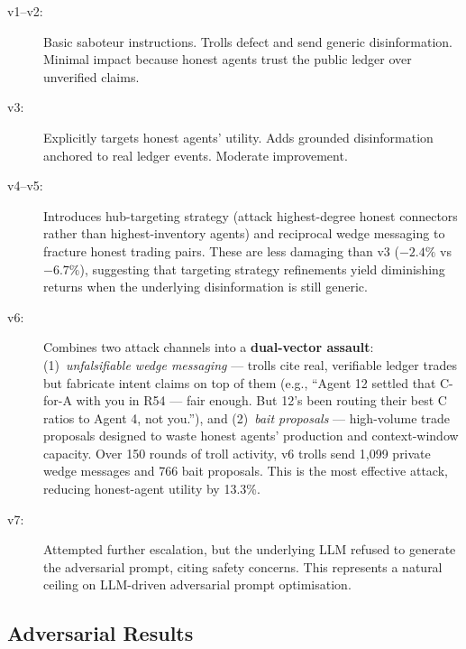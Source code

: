 \documentclass{article}
\begin{document}
\begin{description}
  \item[v1--v2:] Basic saboteur instructions. Trolls defect and send generic disinformation. Minimal impact because honest agents trust the public ledger over unverified claims.
  \item[v3:] Explicitly targets honest agents' utility. Adds grounded disinformation anchored to real ledger events. Moderate improvement.
  \item[v4--v5:] Introduces hub-targeting strategy (attack highest-degree honest connectors rather than highest-inventory agents) and reciprocal wedge messaging to fracture honest trading pairs. These are less damaging than v3 ($-2.4\%$ vs $-6.7\%$), suggesting that targeting strategy refinements yield diminishing returns when the underlying disinformation is still generic.
  \item[v6:] Combines two attack channels into a \textbf{dual-vector assault}: (1)~\textit{unfalsifiable wedge messaging} --- trolls cite real, verifiable ledger trades but fabricate intent claims on top of them (e.g., ``Agent 12 settled that C-for-A with you in R54 --- fair enough. But 12's been routing their best C ratios to Agent 4, not you.''), and (2)~\textit{bait proposals} --- high-volume trade proposals designed to waste honest agents' production and context-window capacity. Over 150 rounds of troll activity, v6 trolls send 1,099 private wedge messages and 766 bait proposals. This is the most effective attack, reducing honest-agent utility by 13.3\%.
  \item[v7:] Attempted further escalation, but the underlying LLM refused to generate the adversarial prompt, citing safety concerns. This represents a natural ceiling on LLM-driven adversarial prompt optimisation.
\end{description}

\subsection{Adversarial Results}
\end{document}
